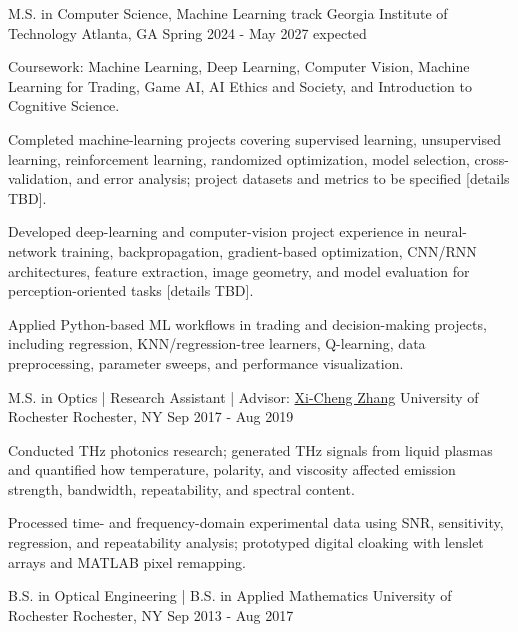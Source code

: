 \begin{cventries}
  \cventry
    {M.S. in Computer Science, Machine Learning track}
    {Georgia Institute of Technology}
    {Atlanta, GA}
    {Spring 2024 - May 2027 expected}
    {
      \begin{cvitems}
        \item {Coursework: Machine Learning, Deep Learning, Computer Vision, Machine Learning for Trading, Game AI, AI Ethics and Society, and Introduction to Cognitive Science.}
        \item {Completed machine-learning projects covering supervised learning, unsupervised learning, reinforcement learning, randomized optimization, model selection, cross-validation, and error analysis; project datasets and metrics to be specified [details TBD].}
        \item {Developed deep-learning and computer-vision project experience in neural-network training, backpropagation, gradient-based optimization, CNN/RNN architectures, feature extraction, image geometry, and model evaluation for perception-oriented tasks [details TBD].}
        \item {Applied Python-based ML workflows in trading and decision-making projects, including regression, KNN/regression-tree learners, Q-learning, data preprocessing, parameter sweeps, and performance visualization.}
      \end{cvitems}
    }

  \cventry
    {M.S. in Optics | Research Assistant | Advisor: \href{https://labsites.rochester.edu/zhang/}{Xi-Cheng Zhang}}
    {University of Rochester}
    {Rochester, NY}
    {Sep 2017 - Aug 2019}
    {
      \begin{cvitems}
        \item {Conducted THz photonics research; generated THz signals from liquid plasmas and quantified how temperature, polarity, and viscosity affected emission strength, bandwidth, repeatability, and spectral content.}
        \item {Processed time- and frequency-domain experimental data using SNR, sensitivity, regression, and repeatability analysis; prototyped digital cloaking with lenslet arrays and MATLAB pixel remapping.}
      \end{cvitems}
    }

  \cventry
    {B.S. in Optical Engineering | B.S. in Applied Mathematics}
    {University of Rochester}
    {Rochester, NY}
    {Sep 2013 - Aug 2017}
    {}
\vspace{-0.4cm}

\end{cventries}
